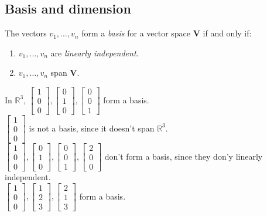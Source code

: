 \subsection{Basis and dimension}
\begin{definition}[Basis]
The vectors $v_1,\dots,v_n$ form a \emph{basis} for a vector space $\bm V$ if and only if:
\begin{enumerate}
\item
$v_1,\dots,v_n$ are \emph{linearly independent}.
\item
$v_1,\dots,v_n$ span $\bm V$.
\end{enumerate}
\end{definition}
\begin{example}
In $\mathbb{R}^{3}$, $\begin{bmatrix}
1\\0\\0
\end{bmatrix},\begin{bmatrix}
0\\1\\0
\end{bmatrix},\begin{bmatrix}
0\\0\\1
\end{bmatrix}$ form a basis.\\
$\begin{bmatrix}
1\\0\\0
\end{bmatrix}$ is not a basis, since it doesn't span $\mathbb{R}^{3}$.\\
$\begin{bmatrix}
1\\0\\0
\end{bmatrix},\begin{bmatrix}
0\\1\\0
\end{bmatrix},\begin{bmatrix}
0\\0\\1
\end{bmatrix},\begin{bmatrix}
2\\0\\0
\end{bmatrix}$ don't form a basis, since they don'y linearly independent.\\
$\begin{bmatrix}
1\\0\\0
\end{bmatrix},\begin{bmatrix}
1\\2\\3
\end{bmatrix},\begin{bmatrix}
2\\1\\3
\end{bmatrix}$ form a basis.
\end{example}
